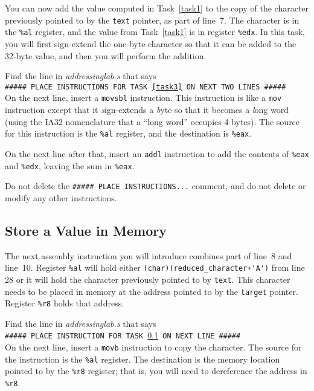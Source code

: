 You can now add the value computed in Task~\ref{task1} to the copy of the
character previously pointed to by the \lstinline{text} pointer, as part of
line~7. The character is in the \lstinline{%al} register, and the value from
Task~\ref{task1} is in register \lstinline{%edx}. In this task, you will first
sign-extend the one-byte character so that it can be added to the 32-byte
value, and then you will perform the addition.

Find the line in \textit{addressinglab.s} that says \\
\texttt{\#\#\#\#\# PLACE INSTRUCTIONS FOR TASK \ref{task3} ON NEXT TWO LINES \#\#\#\#\#} \\
On the next line, insert a \lstinline{movsbl} instruction. This instruction is
like a \lstinline{mov} instruction except that it \textit{s}ign-extends a
\textit{b}yte so that it becomes a \textit{l}ong word (using the IA32
nomenclature that a ``long word'' occupies 4 bytes). The source for this
instruction is the \lstinline{%al} register, and the destination is
\lstinline{%eax}.

On the next line after that, insert an \lstinline{addl} instruction to add the
contents of \lstinline{%eax} and \lstinline{%edx}, leaving the sum in
\lstinline{%eax}.


Do not delete the \texttt{\#\#\#\#\# PLACE INSTRUCTIONS...} comment, and do not
delete or modify any other instructions.

\subsection{Store a Value in Memory}\label{task4}

The next assembly instruction you will introduce combines part of line~8 and
line~10. Register \lstinline{%al} will hold either
\lstinline{(char)(reduced_character+'A')} from line 28 or it will hold the
character previously pointed to by \lstinline{text}. This character needs to be
placed in memory at the address pointed to by the \lstinline{target} pointer.
Register \lstinline{%r8} holds that address.

Find the line in \textit{addressinglab.s} that says \\
\texttt{\#\#\#\#\# PLACE INSTRUCTION FOR TASK \ref{task4} ON NEXT LINE \#\#\#\#\#} \\
On the next line, insert a \lstinline{movb} instruction to copy the character.
The source for the instruction is the \lstinline{%al} register. The destination
is the memory location pointed to by the \lstinline{%r8} register; that is, you
will need to dereference the address in \lstinline{%r8}.

